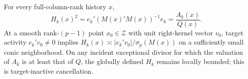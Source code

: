 For every full-column-rank history \(x\), \[H_k(x)^2=e_k'(M(x)'M(x))^{-1}e_k=\frac{A_k(x)}{Q(x)}.\] At a smooth rank-\((p-1)\) point \(x_0\in\mathcal Z\) with unit right-kernel vector \(v_0\), target activity \(e_k'v_0\ne0\) implies \(H_k(x)\asymp |e_k'v_0|/\sigma_p(M(x))\) on a sufficiently small conic neighborhood. On any incident exceptional divisor for which the valuation of \(A_k\) is at least that of \(Q\), the globally defined \(H_k\) remains locally bounded; this is target-inactive cancellation.
